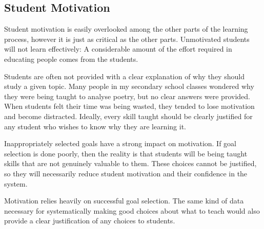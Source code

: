 
    \subsection{Student Motivation}
      Student motivation is easily overlooked among the other parts of the learning process, however it is just as critical as the other parts. Unmotivated students will not learn effectively: A considerable amount of the effort required in educating people comes from the students.

      Students are often not provided with a clear explanation of why they should study a given topic. Many people in my secondary school classes wondered why they were being taught to analyse poetry, but no clear answers were provided. When students felt their time was being wasted, they tended to lose motivation and become distracted. Ideally, every skill taught should be clearly justified for any student who wishes to know why they are learning it.

      Inappropriately selected goals have a strong impact on motivation. If goal selection is done poorly, then the reality is that students will be being taught skills that are not genuinely valuable to them. These choices cannot be justified, so they will necessarily reduce student motivation and their confidence in the system.

      Motivation relies heavily on successful goal selection. The same kind of data necessary for systematically making good choices about what to teach would also provide a clear justification of any choices to students.


